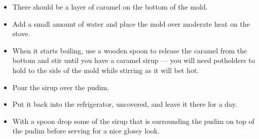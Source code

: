 \documentclass [11pt, letterpaper] {article}
\newcommand \fileName {PudimDeLeite}
\begin{document}
\begin{description}
\begin{enumerate}
\begin{itemize}
	\item There should be a layer of caramel on the bottom of the mold.
	\item Add a small amount of water and place the mold over moderate heat on the stove.
	\item When it starts boiling, use a wooden spoon to release the caramel from the bottom and stir until you have a caramel sirup --- you will need potholders to hold to the side of the mold while stirring as it will bet hot.
	\item Pour the sirup over the pudim.
	\item Put it back into the refrigerator, uncovered, and leave it there for a day.
	\item With a spoon drop some of the sirup that is surrounding the pudim on top of the pudim before serving for a nice glossy look.
	\end{itemize}
	\end{enumerate}
\end{description}


\end{document}
